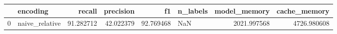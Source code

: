 \begin{tabular}{llrrrlrr}
\toprule
{} &        encoding &     recall &  precision &         f1 & n\_labels &  model\_memory &  cache\_memory \\
\midrule
0 &  naive\_relative &  91.282712 &  42.022379 &  92.769468 &      NaN &   2021.997568 &   4726.980608 \\
\bottomrule
\end{tabular}
